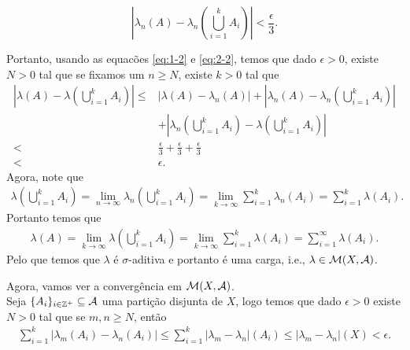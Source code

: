 \begin{homeworkProblem}[2]
\begin{solution}
\begin{enumerate}[a)]
\begin{itemize}
\begin{itemize}
              \begin{equation}\label{eq:2-2}
                \left| \lambda_{n}(A)-\lambda_{n}\left( \bigcup_{i=1}^{k}A_i \right) \right|< \frac{\epsilon}{3}.              
              \end{equation}
          \end{itemize}
          Portanto, usando as equacões \eqref{eq:1-2} e \eqref{eq:2-2}, temos que dado $\epsilon>0$, existe $N>0$ tal que se fixamos um $n\geq N$, existe $k>0$ tal que
          \begin{align*}
            \left| \lambda(A) - \lambda\left( \bigcup_{i=1}^{k}A_i \right)\right|\leq& \left| \lambda(A)-\lambda_{n}(A) \right|+\left| \lambda_{n}(A)-\lambda_{n}\left( \bigcup_{i=1}^{k}A_i \right) \right|\\
            &+\left| \lambda_{n}\left( \bigcup_{i=1}^{k}A_i \right)-\lambda\left( \bigcup_{i=1}^{k}A_i \right) \right|\\
            <&\frac{\epsilon}{3}+\frac{\epsilon}{3}+\frac{\epsilon}{3}\\
            <&\epsilon.
          \end{align*}
          Agora, note que
          \begin{align*}
            \lambda\left( \bigcup_{i=1}^{k}A_i \right)=\lim_{n \to \infty}\lambda_{n}\left( \bigcup_{i=1}^{k}A_i \right)=\lim_{k \to \infty}\sum_{i=1}^{k}\lambda_{n}(A_i)=\sum_{i=1}^{k}\lambda(A_i).
          \end{align*}
          Portanto temos que
          \begin{align*}
            \lambda(A)=\lim_{k \to \infty}\lambda\left( \bigcup_{i=1}^{k} A_i\right)=\lim_{k \to \infty}\sum_{i=1}^{k}\lambda(A_i)=\sum_{i=1}^{\infty}\lambda(A_i).
          \end{align*}
          Pelo que temos que $\lambda$ é $\sigma$-aditiva e portanto é uma carga, i.e., $\lambda\in\mathcal{M}(X,\mathcal{A})$. 
      \end{itemize}
      Agora, vamos ver a convergência em $\mathcal{M}(X,\mathcal{A})$.\\
      Seja $\{A_i\}_{i\in\mathbb{Z}^{+}}\subseteq\mathcal{A}$ uma partição disjunta de $X$, logo temos que dado $\epsilon>0$ existe $N>0$ tal que se $m,n\geq N$, então
      \begin{align*}
        \sum_{i=1}^{k}\left| \lambda_m(A_i)-\lambda_n(A_i) \right|\leq \sum_{i=1}^{k}\left| \lambda_m-\lambda_n \right|(A_i)\leq \left| \lambda_m-\lambda_n \right|(X)<\epsilon.
      \end{align*}

\end{enumerate}
\end{solution}
\end{homeworkProblem}
